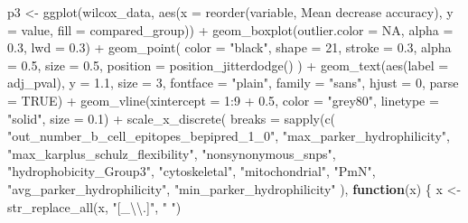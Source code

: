 \documentclass[
  11pt,
  oneside]{book}
\newenvironment{Shaded}{\begin{snugshade}}{\end{snugshade}}
\newcommand{\AttributeTok}[1]{\textcolor[rgb]{0.77,0.63,0.00}{#1}}
\newcommand{\ConstantTok}[1]{\textcolor[rgb]{0.00,0.00,0.00}{#1}}
\newcommand{\ControlFlowTok}[1]{\textcolor[rgb]{0.13,0.29,0.53}{\textbf{#1}}}
\newcommand{\DecValTok}[1]{\textcolor[rgb]{0.00,0.00,0.81}{#1}}
\newcommand{\FloatTok}[1]{\textcolor[rgb]{0.00,0.00,0.81}{#1}}
\newcommand{\FunctionTok}[1]{\textcolor[rgb]{0.00,0.00,0.00}{#1}}
\newcommand{\NormalTok}[1]{#1}
\newcommand{\OtherTok}[1]{\textcolor[rgb]{0.56,0.35,0.01}{#1}}
\newcommand{\SpecialCharTok}[1]{\textcolor[rgb]{0.00,0.00,0.00}{#1}}
\newcommand{\StringTok}[1]{\textcolor[rgb]{0.31,0.60,0.02}{#1}}
\begin{document}
\begin{Shaded}
\begin{Highlighting}[]
\NormalTok{p3 }\OtherTok{\textless{}{-}} \FunctionTok{ggplot}\NormalTok{(wilcox\_data, }\FunctionTok{aes}\NormalTok{(}\AttributeTok{x =} \FunctionTok{reorder}\NormalTok{(variable, }\StringTok{\textasciigrave{}}\AttributeTok{Mean decrease accuracy}\StringTok{\textasciigrave{}}\NormalTok{), }\AttributeTok{y =}\NormalTok{ value, }\AttributeTok{fill =}\NormalTok{ compared\_group)) }\SpecialCharTok{+}
  \FunctionTok{geom\_boxplot}\NormalTok{(}\AttributeTok{outlier.color =} \ConstantTok{NA}\NormalTok{, }\AttributeTok{alpha =} \FloatTok{0.3}\NormalTok{, }\AttributeTok{lwd =} \FloatTok{0.3}\NormalTok{) }\SpecialCharTok{+}
  \FunctionTok{geom\_point}\NormalTok{(}
    \AttributeTok{color =} \StringTok{"black"}\NormalTok{, }\AttributeTok{shape =} \DecValTok{21}\NormalTok{, }\AttributeTok{stroke =} \FloatTok{0.3}\NormalTok{, }\AttributeTok{alpha =} \FloatTok{0.5}\NormalTok{, }\AttributeTok{size =} \FloatTok{0.5}\NormalTok{,}
    \AttributeTok{position =} \FunctionTok{position\_jitterdodge}\NormalTok{()}
\NormalTok{  ) }\SpecialCharTok{+}
  \FunctionTok{geom\_text}\NormalTok{(}\FunctionTok{aes}\NormalTok{(}\AttributeTok{label =}\NormalTok{ adj\_pval), }\AttributeTok{y =} \FloatTok{1.1}\NormalTok{, }\AttributeTok{size =} \DecValTok{3}\NormalTok{, }\AttributeTok{fontface =} \StringTok{"plain"}\NormalTok{, }\AttributeTok{family =} \StringTok{"sans"}\NormalTok{, }\AttributeTok{hjust =} \DecValTok{0}\NormalTok{, }\AttributeTok{parse =} \ConstantTok{TRUE}\NormalTok{) }\SpecialCharTok{+}
  \FunctionTok{geom\_vline}\NormalTok{(}\AttributeTok{xintercept =} \DecValTok{1}\SpecialCharTok{:}\DecValTok{9} \SpecialCharTok{+} \FloatTok{0.5}\NormalTok{, }\AttributeTok{color =} \StringTok{"grey80"}\NormalTok{, }\AttributeTok{linetype =} \StringTok{"solid"}\NormalTok{, }\AttributeTok{size =} \FloatTok{0.1}\NormalTok{) }\SpecialCharTok{+}
  \FunctionTok{scale\_x\_discrete}\NormalTok{(}
    \AttributeTok{breaks =} \FunctionTok{sapply}\NormalTok{(}\FunctionTok{c}\NormalTok{(}
      \StringTok{"out\_number\_b\_cell\_epitopes\_bepipred\_1\_0"}\NormalTok{,}
      \StringTok{"max\_parker\_hydrophilicity"}\NormalTok{,}
      \StringTok{"max\_karplus\_schulz\_flexibility"}\NormalTok{,}
      \StringTok{"nonsynonymous\_snps"}\NormalTok{,}
      \StringTok{"hydrophobicity\_Group3"}\NormalTok{,}
      \StringTok{"cytoskeletal"}\NormalTok{,}
      \StringTok{"mitochondrial"}\NormalTok{,}
      \StringTok{"PmN"}\NormalTok{,}
      \StringTok{"avg\_parker\_hydrophilicity"}\NormalTok{,}
      \StringTok{"min\_parker\_hydrophilicity"}
\NormalTok{    ), }\ControlFlowTok{function}\NormalTok{(x) \{}
\NormalTok{      x }\OtherTok{\textless{}{-}} \FunctionTok{str\_replace\_all}\NormalTok{(x, }\StringTok{"[\_}\SpecialCharTok{\textbackslash{}\textbackslash{}}\StringTok{.]"}\NormalTok{, }\StringTok{" "}\NormalTok{)}

\end{Highlighting}
\end{Shaded}
\end{document}
